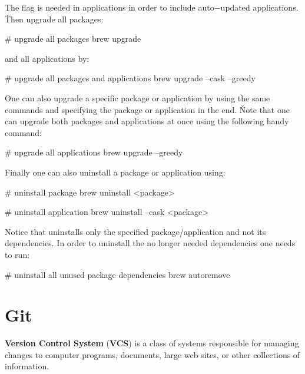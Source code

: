 The flag  is needed in applications in order to include auto$-$updated applications. \v

Then upgrade all packages:

\begin{bash}
# upgrade all packages
brew upgrade
\end{bash}

and all applications by:

\begin{bash}
# upgrade all packages and applications
brew upgrade --cask --greedy
\end{bash}

One can also upgrade a specific package or application by using the same commands and specifying the package or
application in the end. \v

Note that one can upgrade both packages and applications at once using the following handy command:

\begin{bash}
# upgrade all applications
brew upgrade --greedy
\end{bash}

Finally one can also uninstall a package or application using:

\begin{bash}
# uninstall package
brew uninstall <package>
\end{bash}

\begin{bash}
# uninstall application
brew uninstall --cask <package>
\end{bash}

Notice that  uninstalls only the specified package/application and not its dependencies. In
order to uninstall the no longer needed dependencies one needs to run:

\begin{bash}
# uninstall all unused package dependencies
brew autoremove
\end{bash}

\section{Git}


\textbf{Version Control System} (\textbf{VCS}) is a class of systems responsible for managing changes to computer
programs, documents, large web sites, or other collections of information.
\ed

